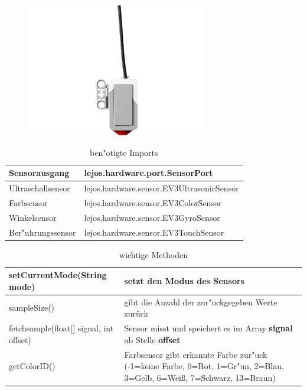 \begin{figure}[H]
{\begin{subfloatrow}
			{\includegraphics[]{images/touch.png}}
		\end{subfloatrow}
	}{}
\end{figure}

\begin{table}[h]
	\begin{tabular}{|p{}| p{}|}
		\hline
		Sensorausgang & lejos.hardware.port.SensorPort\\ \hline
		Ultraschallsensor& lejos.hardware.sensor.EV3UltrasonicSensor
		\\ \hline 
		Farbsensor & lejos.hardware.sensor.EV3ColorSensor\\ \hline 
		Winkelsensor & lejos.hardware.sensor.EV3GyroSensor\\ \hline 
		Ber"uhrungssensor & lejos.hardware.sensor.EV3TouchSensor\\ \hline 
	\end{tabular}
	\caption{ben"otigte Imports}
\end{table}

\begin{table}[H]
	\begin{tabular}{|p{}| p{}|}
		\hline
		setCurrentMode\newline (String mode)& setzt den Modus des Sensors \\ \hline 
		sampleSize() &  gibt die Anzahl der zur"uckgegeben Werte zurück\\ \hline 
		fetchsample(float[] signal, int offset) & Sensor misst und speichert es im Array \textbf{signal} ab Stelle \textbf{offset}\\ \hline
		getColorID() &  Farbsensor gibt erkannte Farbe zur"uck (-1=keine Farbe, 0=Rot, 1=Gr"un, 2=Blau, 3=Gelb, 6=Wei\ss{}, 7=Schwarz, 13=Braun)\\ \hline 
	\end{tabular}
	\caption{wichtige Methoden}
\end{table}


